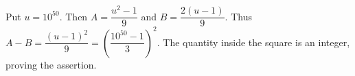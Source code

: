Put $u=10^{50}$. Then $A=\dfrac{u^2-1}{9}$ and $B=\dfrac{2(u-1)}{9}$. Thus $A-B=\dfrac{(u-1)^2}{9}=\left(\dfrac{10^{50}-1}{3}\right)^2$. The quantity inside the square is an integer, proving the assertion.
